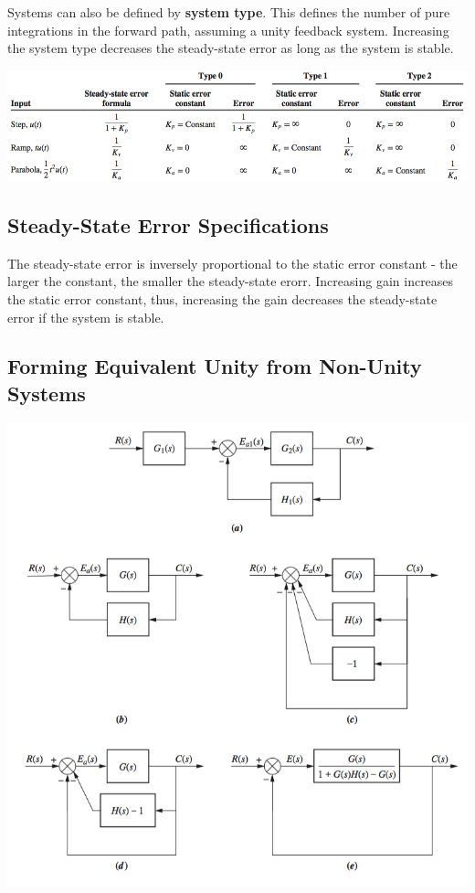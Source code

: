 \documentclass[11pt]{article}
\begin{document}
    Systems can also be defined by \textbf{system type}. This defines the number of pure integrations in the forward path, assuming a unity feedback system. Increasing the system type decreases the steady-state error as long as the system is stable.

    \begin{center}
        \includegraphics[width=300 px]{img/types} \\
    \end{center}

    \subsection{Steady-State Error Specifications}

   The steady-state error is inversely proportional to the static error constant - the larger the constant, the smaller the steady-state erorr. Increasing gain increases the static error constant, thus, increasing the gain decreases the steady-state error if the system is stable.

   \subsection{Forming Equivalent Unity from Non-Unity Systems}

   \begin{center}
    \includegraphics[width=300 px]{img/nonunity} \\
    \end{center}
\end{document}

